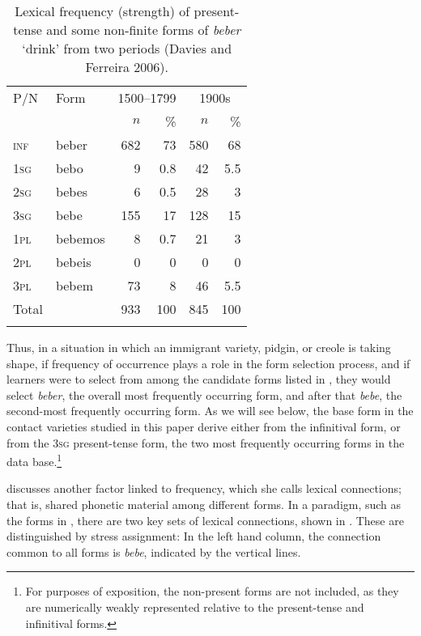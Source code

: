 \documentclass[output=paper,colorlinks,citecolor=brown]{langscibook}
\begin{document}
\begin{table}
\begin{tabular}{ll rr rr}
\lsptoprule
{P/N} & {Form} & \multicolumn{2}{c}{{1500--1799}} & \multicolumn{2}{c}{{1900s}}\\\cmidrule(lr){3-4}\cmidrule(lr){5-6}
      &        & $n$ & \% & $n$ & \%\\\midrule
\textsc{inf} & beber   & 682 & 73\phantom{.0}  & 580 & 68\phantom{.0}   \\
1\textsc{sg} & bebo    & 9   & 0.8  & 42  & 5.5  \\
2\textsc{sg} & bebes   & 6   & 0.5  & 28  & 3\phantom{.0}  \\
3\textsc{sg} & bebe    & 155 & 17\phantom{.0}  & 128 & 15\phantom{.0} \\
1\textsc{pl} & bebemos & 8   & 0.7  & 21  & 3\phantom{.0}  \\
2\textsc{pl} & bebeis  & 0   & 0\phantom{.0}   & 0   & 0\phantom{.0}  \\
3\textsc{pl} & bebem   & 73  & 8\phantom{.0}   & 46  & 5.5  \\
\midrule 
{Total} &  & 933 &100  & 845 &100 \\
\lspbottomrule
\end{tabular}
\caption{Lexical frequency (strength) of present-tense and some non-finite forms of \textit{beber} `drink' from two periods (Davies and Ferreira 2006).\label{tab:clements:2}}
\end{table}


Thus, in a situation in which an immigrant variety, pidgin, or creole is taking shape, if frequency of occurrence plays a role in the form selection process, and if learners were to select from among the candidate forms listed in , they would select \textit{beber}, the overall most frequently occurring form, and after that \textit{bebe}, the second-most frequently occurring form. As we will see below, the base form in the contact varieties studied in this paper derive either from the infinitival form, or from the 3\textsc{sg }present-tense form, the two most frequently occurring forms in the \citet{DaviesFerreira2006} data base.\footnote{For purposes of exposition, the non-present forms are not included, as they are numerically weakly represented relative to the present-tense and infinitival forms.}

\citet[123--27]{Bybee1985} discusses another factor linked to frequency, which she calls lexical connections; that is, shared phonetic material among different forms. In a paradigm, such as the forms in , there are two key sets of lexical connections, shown in . These are distinguished by stress assignment: In the left hand column, the connection common to all forms is \textit{\textprimstress bebe}, indicated by the vertical lines.
\end{document}
